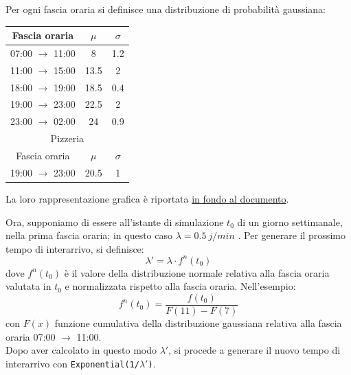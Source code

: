 \documentclass[a4paper, 12pt]{article}
\begin{document}
Per ogni fascia oraria si definisce una distribuzione di probabilità gaussiana:\\

\begin{table}[H]
\centering
\begin{tabular}{ |c|c|c| }
	\hline
    \cellcolor{cellcolor} Fascia oraria & \cellcolor{cellcolor}$\mu$ & \cellcolor{cellcolor}$\sigma$\\
	\hline
    \hline

  	07:00 $\rightarrow$ 11:00 & 8 & 1.2 \\
    \hline	
	
	11:00 $\rightarrow$ 15:00 & 13.5 & 2 \\
    \hline
  
	18:00 $\rightarrow$ 19:00 & 18.5 & 0.4 \\  
    \hline
    
	19:00 $\rightarrow$ 23:00 & 22.5 & 2\\
    \hline
    
    23:00 $\rightarrow$ 02:00 & 24 & 0.9 \\
    \hline    
    \hline
    
    \multicolumn{3}{|c|}{\cellcolor{cellcolor} Pizzeria}\\
    \hline
    \cellcolor{cellcolor} Fascia oraria & \cellcolor{cellcolor}$\mu$ & \cellcolor{cellcolor}$\sigma$\\
	\hline
    \hline
    19:00 $\rightarrow$ 23:00 & 20.5 & 1\\
    \hline
    
\end{tabular}
\end{table}

La loro rappresentazione grafica è riportata \hyperlink{rappresentazione grafica gaussiane}{in fondo al documento}. 
\bigskip

Ora, supponiamo di essere all'istante di simulazione $t_0$ di un giorno settimanale, nella prima fascia oraria; in questo caso $\lambda = 0.5\ j/min$ .  Per generare il prossimo tempo di interarrivo, si definisce:
\[
\lambda' = \lambda \cdot f^n(t_0)
\]
dove $f^n(t_0)$ è il valore della distribuzione normale relativa alla fascia oraria valutata in $t_0$ e normalizzata rispetto alla fascia oraria. Nell'esempio:
\[
f^n(t_0) = \frac{f(t_0)}{F(11) - F(7)}
\]
con $F(x)$ funzione cumulativa della distribuzione gaussiana relativa alla fascia oraria 07:00 $\rightarrow$ 11:00.\\
Dopo aver calcolato in questo modo $\lambda'$, si procede a generare il nuovo tempo di interarrivo con \texttt{Exponential(1/}$\lambda'$\texttt{)}.\\
\end{document}
